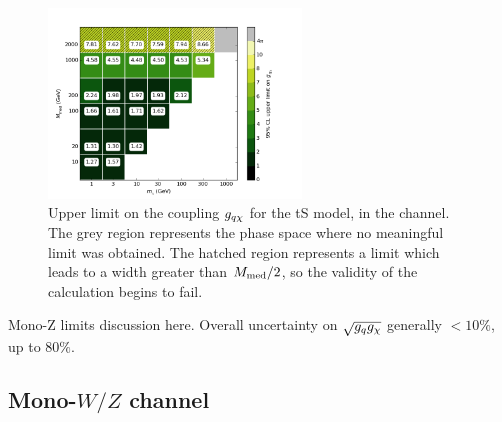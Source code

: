 \begin{figure}[h]
  \centering
    \includegraphics[width=0.6\textwidth]{figures/grid_allpoints_TSD_rat1.png}
    \caption{Upper limit on the coupling $g_{q \chi}$ for the tS model, in the \monoZ channel. The grey region represents the phase space where no meaningful limit was obtained. The hatched region represents a limit which leads to a width greater than $M_{\mathrm{med}} / 2$, so the validity of the calculation begins to fail.}
    \label{fig:MonoZ_TSD_couplinglimit}
\end{figure}

Mono-Z limits discussion here. Overall uncertainty on $\sqrt{g_q g_{\chi}}$ generally $ < 10\%$, up to 80$\%$.

\subsection{Mono-$W/Z$ channel}

